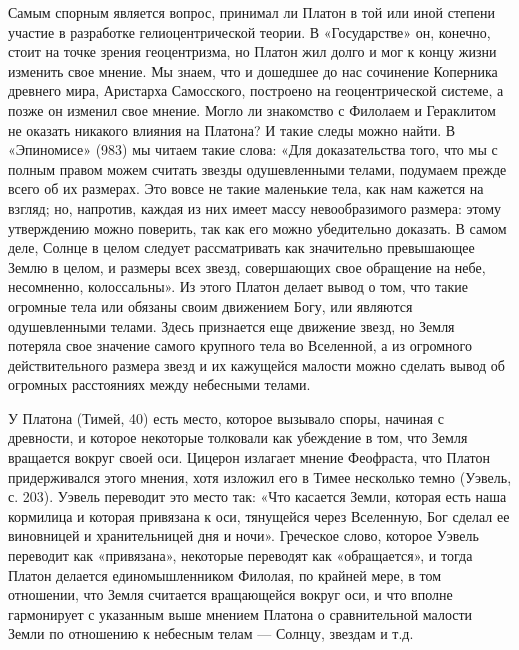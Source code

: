 Самым  спорным является  вопрос, принимал  ли  Платон в  той или  иной
степени участие в разработке гелиоцентрической теории. В «Государстве»
он,  конечно,  стоит  на  точке зрения  геоцентризма,  но  Платон  жил
долго  и  мог к  концу  жизни  изменить  свое  мнение. Мы  знаем,  что
и  дошедшее  до  нас  сочинение  Коперника  древнего  мира,  Аристарха
Самосского, построено  на геоцентрической системе, а  позже он изменил
свое мнение.  Могло ли знакомство  с Филолаем и Гераклитом  не оказать
никакого влияния на Платона? И  такие следы можно найти. В «Эпиномисе»
(983)  мы читаем  такие  слова:  «Для доказательства  того,  что мы  с
полным  правом можем  считать  звезды  одушевленными телами,  подумаем
прежде  всего об  их  размерах.  Это вовсе  не  такие маленькие  тела,
как  нам  кажется  на  взгляд;  но,  напротив,  каждая  из  них  имеет
массу невообразимого  размера: этому  утверждению можно  поверить, так
как  его можно  убедительно доказать.  В  самом деле,  Солнце в  целом
следует  рассматривать как  значительно превышающее  Землю в  целом, и
размеры всех  звезд, совершающих  свое обращение на  небе, несомненно,
колоссальны». Из этого  Платон делает вывод о том,  что такие огромные
тела  или обязаны  своим  движением Богу,  или являются  одушевленными
телами.  Здесь  признается  еще  движение  звезд,  но  Земля  потеряла
свое  значение  самого крупного  тела  во  Вселенной, а  из  огромного
действительного  размера звезд  и их  кажущейся малости  можно сделать
вывод об огромных расстояниях между небесными телами.

У Платона  (Тимей, 40) есть  место, которое вызывало споры,  начиная с
древности,  и которое  некоторые толковали  как убеждение  в том,  что
Земля вращается  вокруг своей оси. Цицерон  излагает мнение Феофраста,
что  Платон  придерживался этого  мнения,  хотя  изложил его  в  Тимее
несколько темно (Уэвель, с. 203). Уэвель переводит это место так: «Что
касается  Земли,  которая  есть  наша кормилица  и  которая  привязана
к  оси,  тянущейся  через  Вселенную,   Бог  сделал  ее  виновницей  и
хранительницей дня и ночи».  Греческое слово, которое Уэвель переводит
как «привязана», некоторые переводят  как «обращается», и тогда Платон
делается единомышленником  Филолая, по крайней мере,  в том отношении,
что Земля считается вращающейся вокруг оси, и что вполне гармонирует с
указанным  выше  мнением  Платона  о сравнительной  малости  Земли  по
отношению к небесным телам --- Солнцу, звездам и т.д.

